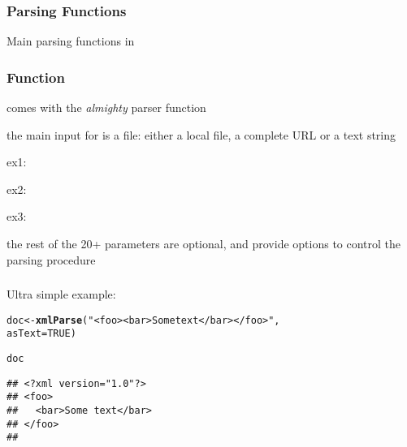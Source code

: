 \documentclass[12pt]{beamer}\usepackage[]{graphicx}\usepackage[]{color}
\makeatletter
\newcommand{\hlnum}[1]{\textcolor[rgb]{0.686,0.059,0.569}{#1}}%
\newcommand{\hlstr}[1]{\textcolor[rgb]{0.192,0.494,0.8}{#1}}%
\newcommand{\hlstd}[1]{\textcolor[rgb]{0.345,0.345,0.345}{#1}}%
\newcommand{\hlkwb}[1]{\textcolor[rgb]{0.69,0.353,0.396}{#1}}%
\newcommand{\hlkwc}[1]{\textcolor[rgb]{0.333,0.667,0.333}{#1}}%
\newcommand{\hlkwd}[1]{\textcolor[rgb]{0.737,0.353,0.396}{\textbf{#1}}}%
\newenvironment{kframe}{%
 \def\at@end@of@kframe{}%
 \ifinner\ifhmode%
  \def\at@end@of@kframe{\end{minipage}}%
  \begin{minipage}{\columnwidth}%
 \fi\fi%
 \def\FrameCommand##1{\hskip\@totalleftmargin \hskip-\fboxsep
 \colorbox{shadecolor}{##1}\hskip-\fboxsep
     \hskip-\linewidth \hskip-\@totalleftmargin \hskip\columnwidth}%
 \MakeFramed {\advance\hsize-\width
   \@totalleftmargin\z@ \linewidth\hsize
   \@setminipage}}%
 {\par\unskip\endMakeFramed%
 \at@end@of@kframe}
\newenvironment{knitrout}{}{} %
\makeatother
\begin{document}

\begin{frame}
\begin{center}
\Huge{}
\end{center}
\end{frame}


\begin{frame}
\frametitle{Parsing Functions}

Main parsing functions in 
\bbi
 \item {}
 \item {}
 \item {}
 \item {}
\ei

\end{frame}


\begin{frame}
\frametitle{Function }

\bi
\item {} comes with the \textit{almighty} parser function {\hilit {}}
 \item the main input for {\hilit {}} is a file: either a local file, a complete URL or a text string
 \bi
 \item[ex1:] 
 \item[ex2:] 
 \item[ex3:] 
 \ei
 \item the rest of the 20+ parameters are optional, and provide options to control the parsing procedure
\ei
\eb

\end{frame}


\begin{frame}[fragile]
\frametitle{}

Ultra simple example:
\begin{knitrout}\footnotesize
{}\color{fgcolor}\begin{kframe}
\begin{alltt}
\hlstd{doc} \hlkwb{<-} \hlkwd{xmlParse}\hlstd{(}\hlstr{"<foo><bar>Some text</bar></foo>"}\hlstd{,}
                \hlkwc{asText} \hlstd{=} \hlnum{TRUE}\hlstd{)}

\hlstd{doc}
\end{alltt}
\begin{verbatim}
## <?xml version="1.0"?>
## <foo>
##   <bar>Some text</bar>
## </foo>
## 
\end{verbatim}
\end{kframe}
\end{knitrout}

\end{frame}
\end{document}
